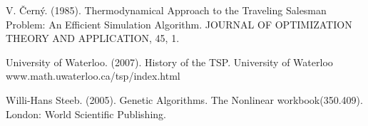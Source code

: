 \documentclass[twoside,twocolumn]{article}
\begin{document}
  \begin{thebibliography}{99} %
  
  
  V. Černý. (1985). 
  \newblock Thermodynamical Approach to the Traveling Salesman Problem: An Efficient Simulation Algorithm. 
  \newblock JOURNAL OF OPTIMIZATION THEORY AND APPLICATION, 45, 1.
  
  University of Waterloo. (2007). 
  \newblock History of the TSP. University of Waterloo
  \newblock www.math.uwaterloo.ca/tsp/index.html
  
  Willi-Hans Steeb. (2005). 
  \newblock Genetic Algorithms. 
  \newblock The Nonlinear workbook(350.409). London: World Scientific Publishing.
  
  \end{thebibliography}
  
  
  
\end{document}
